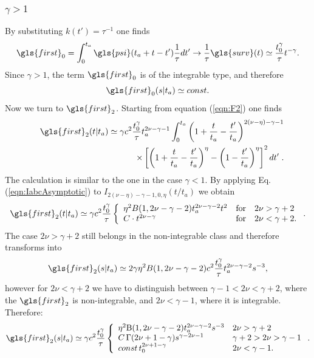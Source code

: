 \subsubsection{$\gamma>1$}
By substituting $k(t')=\tau^{-1}$ one finds 
\begin{equation}
 \gls{first}_0 = \int_0^{t_a} \gls{psi}(t_a + t- t') \frac{1}{\tau} dt' \to \frac{1}{\tau} \gls{surv}(t) \simeq \frac{t_0^\gamma}{\tau} t^{-\gamma}.
\end{equation}
Since $\gamma > 1$, the term $\gls{first}_0$ is of the integrable type, and therefore
\begin{equation}
 \gls{first}_0(s|t_a) \simeq const. 
\end{equation}
Now we turn to $\gls{first}_2$.  Starting from equation (\ref{eqn:F2}) one finds 
\begin{align}
&& \gls{first}_{2}(t|t_a) \simeq   \gamma c^2 \frac{t_0^{\gamma} }{\tau}  t_a^{2\nu-\gamma-1}\int^{t_a}_0 \left(1+\frac{t}{t_a}-\frac{t'}{t_a} \right)^{2(\nu-\eta)-\gamma-1} \nonumber \\
&& \qquad \times \left[ \left(1+\frac{t}{t_a}-\frac{t'}{t_a} \right)^\eta-\left(1- \frac{t'}{t_a}\right)^\eta \right]^2  dt' \; .
\end{align}
The calculation is similar to the one in the case $\gamma<1$. By applying Eq.(\ref{eqn:IabcAsymptotic}) to $I_{2(\nu-\eta)-\gamma-1,0,\eta}(t/t_a)$ we obtain 
%
\begin{align}
\gls{first}_{2}(t|t_a) \simeq  \gamma c^2 \frac{ t_0^{\gamma} }{\tau}    \left\{ \begin{array}{l l l}
\eta^2 B(1, 2\nu -\gamma -2) t_a^{2\nu-\gamma-2}t^2  &\mathrm{for} & 2\nu> \gamma+2\\
 C \cdot t^{2\nu-\gamma} & \mathrm{for} & 2\nu < \gamma+2.
\end{array} \right. .
\end{align}
%
The case $2\nu> \gamma+2$ still belongs in the non-integrable class and therefore transforms into 
\begin{equation}
\gls{first}_{2}(s|t_a) \simeq 2 \gamma \eta^2 B(1,2\nu -\gamma -2) c^2 \frac{t_0^{\gamma}}{\tau}   t_a^{2\nu-\gamma-2}  s^{-3} ,
\end{equation}
however for $2\nu < \gamma+2$ we have to distinguish between $\gamma -1 < 2\nu < \gamma+2$, where the $\gls{first}_2$ is non-integrable, and $2\nu < \gamma -1$, where it is integrable. 
Therefore:
\begin{align}
 \gls{first}_{2}(s|t_a) \simeq \gamma  c^2\frac{ t_0^{\gamma}}{\tau}  \left\{ \begin{array}{l l l}
\eta^2\mathrm{B}(1,2\nu-\gamma-2) t_a^{2\nu-\gamma-2}  s^{-3} & 2\nu> \gamma+2\\
C \, \Gamma(2\nu+1-\gamma) s^{\gamma-2\nu-1} & \gamma+2> 2\nu > \gamma -1\\
const\,t_0^{2\nu+1-\gamma } & 2\nu < \gamma -1.
\end{array} \right.  .
\end{align}


